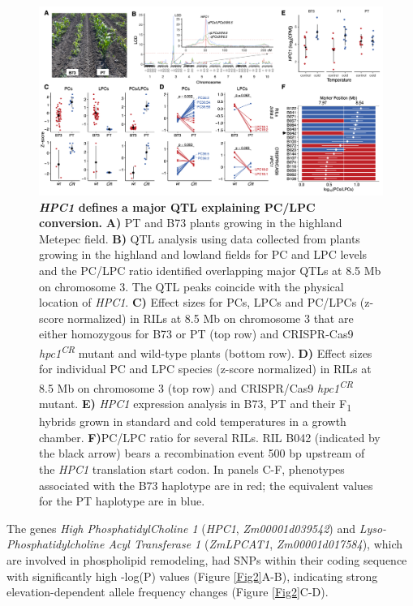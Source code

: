 \documentclass[9pt,twocolumn,twoside,lineno]{BioRxiv}
\begin{document}
\begin{figure}[!ht]
\begin{center}
\includegraphics[width=0.8\paperwidth]{Figures/Fig_3.png}
\caption{\textbf{\textit{HPC1} defines a major QTL explaining PC/LPC conversion.} 
\textbf{A)} PT and B73 plants growing in the highland Metepec field. 
\textbf{B)} QTL analysis using data collected from plants growing in the highland and lowland fields for PC and LPC levels and the PC/LPC ratio identified overlapping major QTLs at 8.5 Mb on chromosome 3. 
The QTL peaks coincide with the physical location of \textit{HPC1}. 
\textbf{C)} Effect sizes for PCs, LPCs and PC/LPCs (z-score normalized) in RILs at 8.5 Mb on chromosome 3 that are either homozygous for B73 or PT (top row) and CRISPR-Cas9 \textit{hpc1\textsuperscript{CR}} mutant and wild-type plants (bottom row).        
\textbf{D)} Effect sizes for individual PC and LPC species (z-score normalized) in RILs at 8.5 Mb on chromosome 3 (top row) and CRISPR/Cas9 \textit{hpc1\textsuperscript{CR}} mutant.
\textbf{E)} \textit{HPC1} expression analysis in B73, PT and their F\textsubscript{1} hybrids grown in standard and cold temperatures in a growth chamber.
\textbf{F)}PC/LPC ratio for several RILs. RIL B042 (indicated by the black arrow) bears a recombination event 500 bp upstream of the \textit{HPC1} translation start codon.
In panels C-F, phenotypes associated with the B73 haplotype are in red; the equivalent values for the PT haplotype are in blue.}
\label{Fig3}
\end{center}
\end{figure} 
The genes  \textit{High PhosphatidylCholine 1} (\textit{HPC1}, \textit{Zm00001d039542}) and \textit{Lyso-Phosphatidylcholine Acyl Transferase 1} (\textit{ZmLPCAT1}, \textit{Zm00001d017584}), which are involved in phospholipid remodeling, had SNPs within their coding sequence with significantly high -log(P) values (Figure \ref{Fig2}A-B), indicating strong elevation-dependent allele frequency changes (Figure \ref{Fig2}C-D). 
\end{document}
